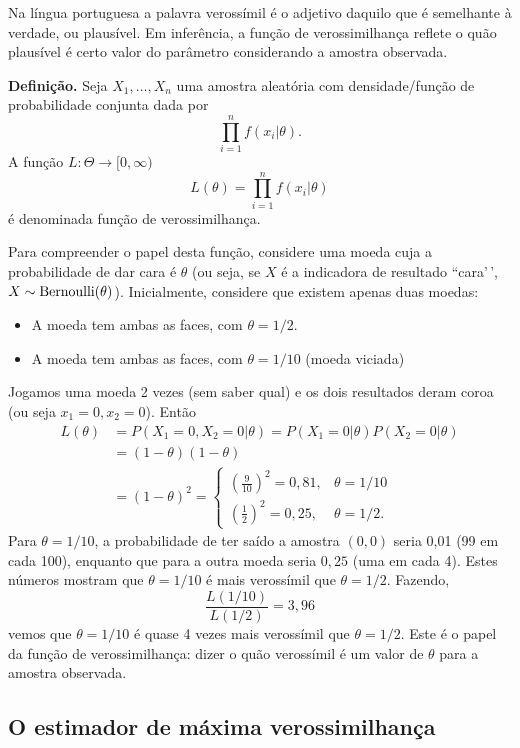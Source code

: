 \documentclass[
  letterpaper,
  DIV=11,
  numbers=noendperiod]{scrartcl}
\providecommand{\tightlist}{%
  \setlength{\itemsep}{0pt}\setlength{\parskip}{0pt}}\usepackage{longtable,booktabs,array}
\begin{document}
Na língua portuguesa a palavra verossímil é o adjetivo daquilo que é
semelhante à verdade, ou plausível. Em inferência, a função de
verossimilhança reflete o quão plausível é certo valor do parâmetro
considerando a amostra observada.

\textbf{Definição.} Seja \(X_1,\ldots,X_n\) uma amostra aleatória com
densidade/função de probabilidade conjunta dada por
\[\prod_{i=1}^nf(x_i|\theta).\] A função
\(L:\Theta\rightarrow [0,\infty)\)
\[L(\theta)=\prod_{i=1}^nf(x_i|\theta)\] é denominada função de
verossimilhança.

Para compreender o papel desta função, considere uma moeda cuja a
probabilidade de dar cara é \(\theta\) (ou seja, se \(X\) é a indicadora
de resultado ``cara'\,', \(X\sim\hbox{Bernoulli}(\theta)\)).
Inicialmente, considere que existem apenas duas moedas:

\begin{itemize}
\tightlist
\item
  A moeda tem ambas as faces, com \(\theta=1/2\).
\item
  A moeda tem ambas as faces, com \(\theta=1/10\) (moeda viciada)
\end{itemize}

Jogamos uma moeda 2 vezes (sem saber qual) e os dois resultados deram
coroa (ou seja \(x_1=0,x_2=0\)). Então \[\begin{align*}
L(\theta)&=P(X_1=0,X_2=0|\theta)=P(X_1=0|\theta) 
P(X_2=0|\theta)\\
&=(1-\theta) (1-\theta)\\
&=(1-\theta)^2=\left\{\begin{array}{ll}
\left(\frac{9}{10}\right)^2=0,81,& \theta=1/10\\
\left(\frac{1}{2}\right)^2=0,25,& \theta=1/2.
\end{array}\right.
\end{align*}\] Para \(\theta=1/10\), a probabilidade de ter saído a
amostra \((0,0)\) seria 0,01 (99 em cada 100), enquanto que para a outra
moeda seria \(0,25\) (uma em cada 4). Estes números mostram que
\(\theta=1/10\) é mais verossímil que \(\theta=1/2\). Fazendo,
\[\frac{L(1/10)}{L(1/2)}=3,96\] vemos que \(\theta=1/10\) é quase 4
vezes mais verossímil que \(\theta=1/2\). Este é o papel da função de
verossimilhança: dizer o quão verossímil é um valor de \(\theta\) para a
amostra observada.

\subsection{O estimador de máxima
verossimilhança}\label{o-estimador-de-muxe1xima-verossimilhanuxe7a}
\end{document}
